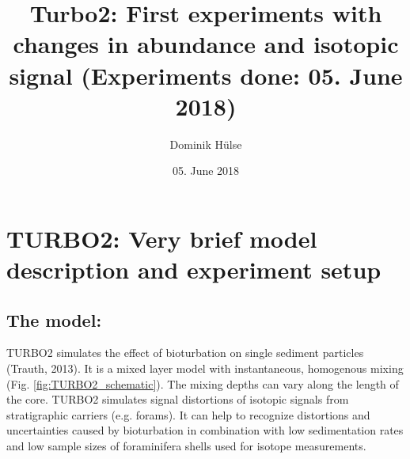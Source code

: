 \documentclass[a4paper,oneside,9pt]{article}
\begin{document}
\pagestyle{plain} %



\title{Turbo2: First experiments with changes in abundance and isotopic signal (Experiments done: 05. June 2018)}
\author{Dominik H\"ulse} %
\date{05. June 2018} %
\maketitle


\section{TURBO2: Very brief model description and experiment setup}\label{Intro_TURBO2} %
\subsection{The model:}
TURBO2 simulates the effect of bioturbation on single sediment particles (Trauth, 2013). It is a mixed layer model with instantaneous, homogenous mixing (Fig. \ref{fig:TURBO2_schematic}).
The mixing depths can vary along the length of the core. TURBO2 simulates signal distortions of isotopic signals from stratigraphic carriers (e.g. forams). It can help to recognize distortions and uncertainties 
caused by bioturbation in combination with low sedimentation rates and low sample sizes of foraminifera shells used for isotope measurements.\\
\end{document}
